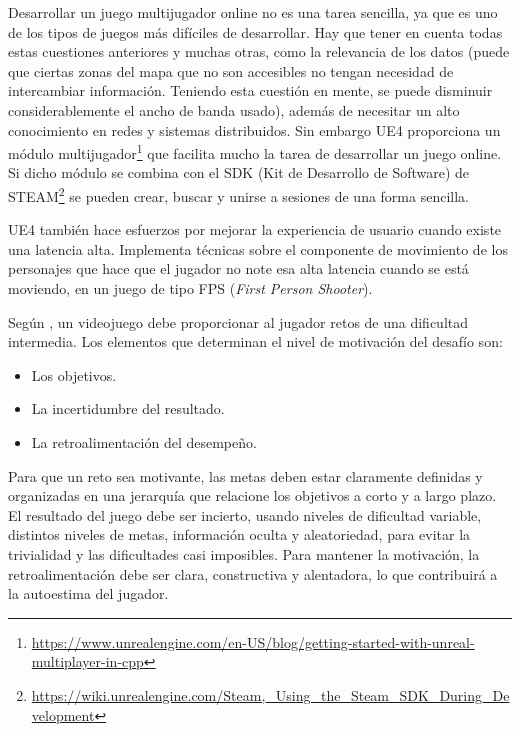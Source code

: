 Desarrollar un juego multijugador online no es una tarea sencilla, ya que es uno de los tipos de juegos más difíciles de desarrollar. Hay que tener en cuenta todas estas cuestiones anteriores y muchas otras, como la relevancia de los datos (puede que ciertas zonas del mapa que no son accesibles no tengan necesidad de intercambiar información. Teniendo esta cuestión en mente, se puede disminuir considerablemente el ancho de banda usado), además de necesitar un alto conocimiento en redes y sistemas distribuidos. Sin embargo UE4 proporciona un módulo multijugador\footnote{\url{https://www.unrealengine.com/en-US/blog/getting-started-with-unreal-multiplayer-in-cpp}} que facilita mucho la tarea de desarrollar un juego online. Si dicho módulo se combina con el SDK (Kit de Desarrollo de Software) de STEAM\footnote{\url{https://wiki.unrealengine.com/Steam,_Using_the_Steam_SDK_During_Development}} se pueden crear, buscar y unirse a sesiones de una forma sencilla.

UE4 también hace esfuerzos por mejorar la experiencia de usuario cuando existe una latencia alta. Implementa técnicas sobre el componente de movimiento de los personajes que hace que el jugador no note esa alta latencia cuando se está moviendo, en un juego de tipo FPS (\textit{First Person Shooter}).

Según \cite{10}, un videojuego debe proporcionar al jugador retos de una dificultad intermedia. Los elementos que determinan el nivel de motivación del desafío son:

\begin{itemize}
\item Los objetivos.
\item La incertidumbre del resultado.
\item La retroalimentación del desempeño.
\end{itemize}

Para que un reto sea motivante, las metas deben estar claramente definidas y organizadas en una jerarquía que relacione los objetivos a corto y a largo plazo. El resultado del juego debe ser incierto, usando niveles de dificultad variable, distintos niveles de metas, información oculta y aleatoriedad, para evitar la trivialidad y las dificultades casi imposibles. Para mantener la motivación, la retroalimentación debe ser clara, constructiva y alentadora, lo que contribuirá a la autoestima del jugador.

